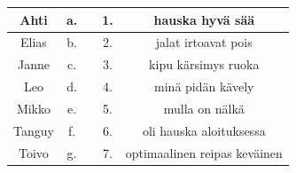 \begin{center}
	\begin{tabular}{ |c||ccc||c| }
		\hline
		Ahti & a. & & 1. & hauska hyvä sää \\
		\hline
		Elias & b. & & 2. & jalat irtoavat pois \\
		\hline
		Janne & c. & & 3. & kipu kärsimys ruoka \\
		\hline
		Leo & d. & & 4. & minä pidän kävely \\
		\hline
		Mikko & e. & & 5. & mulla on nälkä \\
		\hline
		Tanguy & f. & & 6. & oli hauska aloituksessa \\
		\hline
		Toivo & g. & & 7. & optimaalinen reipas keväinen \\
		\hline



	\end{tabular}
\end{center}

